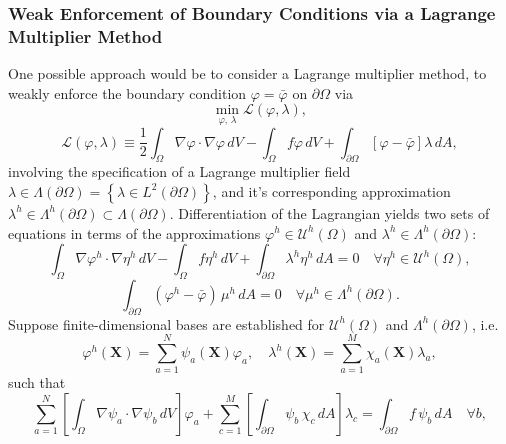 	\subsubsection*{Weak Enforcement of Boundary Conditions via a Lagrange Multiplier Method}
	
	One possible approach would be to consider a Lagrange multiplier method, to weakly enforce the boundary condition $\varphi = \bar{\varphi}$ on $\partial \Omega$ via
	\begin{equation}
		\min_{\varphi, \, \lambda} \mathcal{L}(\varphi,\lambda),
	\end{equation}
	\begin{equation}
	\mathcal{L}(\varphi,\lambda) \equiv \frac{1}{2} \int_{\Omega} \nabla \varphi \cdot \nabla \varphi \, dV - \int_{\Omega} f \varphi \, dV + \int_{\partial \Omega} \left[ \varphi - \bar{\varphi} \right] \lambda \, dA,
\end{equation}
	involving the specification of a Lagrange multiplier field $\lambda \in \Lambda (\partial \Omega) = \left\{ \lambda \in L^2 (\partial \Omega) \right\}$, and it's corresponding approximation $\lambda^h \in \Lambda^h (\partial \Omega) \subset \Lambda (\partial \Omega)$. Differentiation of the Lagrangian yields two sets of equations in terms of the approximations $\varphi^h \in \mathcal{U}^h (\Omega)$ and $\lambda^h \in \Lambda^h (\partial \Omega)$:
	\begin{equation}
		\int_{\Omega} \nabla \varphi^h \cdot \nabla \eta^h \, dV - \int_\Omega f \eta^h \, dV + \int_{\partial \Omega} \lambda^h \eta^h \, dA = 0 \quad \forall \eta^h \in \mathcal{U}^h (\Omega),
	\end{equation}
	\begin{equation}
		\int_{\partial \Omega} (\varphi^h - \bar{\varphi}) \, \mu^h \, dA = 0 \quad \forall \mu^h \in \Lambda^h (\partial \Omega).
	\end{equation}
	Suppose finite-dimensional bases are established for $\mathcal{U}^h (\Omega)$ and $\Lambda^h (\partial \Omega)$, i.e.
\begin{equation}
	\varphi^h (\mathbf{X}) = \sum_{a=1}^{N} \psi_a (\mathbf{X}) \varphi_a, \quad \lambda^h (\mathbf{X}) = \sum_{a=1}^{M} \chi_a (\mathbf{X}) \lambda_a,
\end{equation}
such that
\begin{equation}
	\sum_{a=1}^N \left[ \int_{\Omega} \nabla \psi_a \cdot \nabla \psi_b \, dV \right] \varphi_a + \sum_{c=1}^M \left[ \int_{\partial \Omega} \psi_b \, \chi_c \, dA \right] \lambda_c = \int_{\partial \Omega} f \, \psi_b \, dA \quad \forall b,
\end{equation}
